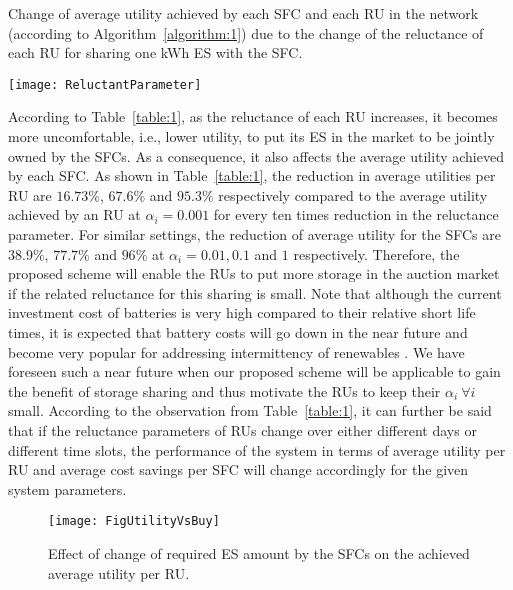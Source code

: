 \documentclass[journal,10pt]{IEEEtran}
\begin{document}
\begin{table}[t]
\centering
\caption{Change of average utility achieved by each SFC and each RU in the network (according to Algorithm~\ref{algorithm:1}) due to the change of the reluctance of each RU for sharing one kWh ES with the SFC.}
\texttt{[image: ReluctantParameter]}
\label{table:1}
\end{table}

According to Table~\ref{table:1}, as the reluctance of each RU increases, it becomes more uncomfortable, i.e., lower utility, to put its ES in the market to be jointly owned by the SFCs. As a consequence, it also affects the average utility achieved by each SFC. As shown in Table~\ref{table:1}, the reduction in average utilities per RU are $16.73\%$, $67.6\%$ and $95.3\%$ respectively compared to the average utility achieved by an RU at $\alpha_i = 0.001$ for every ten times reduction in the reluctance parameter. For similar settings, the reduction of average utility for the SFCs are $38.9\%$, $77.7\%$ and $96\%$ at $\alpha_i = 0.01, 0.1$ and $1$ respectively. Therefore, the proposed scheme will enable the RUs to put more storage in the auction  market if the related reluctance for this sharing is small. Note that although the current investment cost of batteries is very high compared to their relative short life times, it is expected that battery costs will go down in the near future \cite{Wang-JTSG:2013}  and become very popular for addressing intermittency of renewables \cite{Tesla:2015}. We have foreseen such a near future when our proposed scheme will be applicable to gain the benefit of storage sharing and thus motivate the RUs to keep their $\alpha_i~\forall i$ small. According to the observation from Table~\ref{table:1}, it can further be said that if the reluctance parameters of RUs change over either different days or different time slots, the performance of the system in terms of average utility per RU and average cost savings per SFC will change accordingly for the given system parameters.
\begin{figure}[t]
\centering
\texttt{[image: FigUtilityVsBuy]}
\caption{Effect of change of required ES amount by the SFCs on the achieved average utility per RU.} \label{fig:UtilityVsBuyAmount}
\end{figure}
\end{document}
